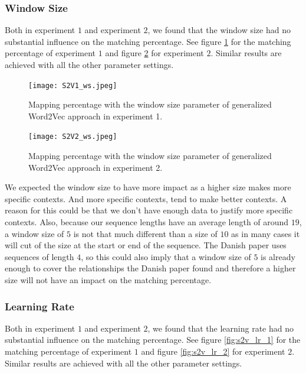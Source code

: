 \subsubsection{Window Size}

Both in experiment $1$ and experiment $2$, we found that the window size had no substantial influence on the matching percentage. See figure \ref{fig:s2v_ws_1} for the matching percentage of experiment $1$ and figure \ref{fig:s2v_ws_2} for experiment $2$. Similar results are achieved with all the other parameter settings. \\

\begin{figure}[!htb]
	\centering
	\texttt{[image: S2V1\_ws.jpeg]}
	\caption{Mapping percentage with the window size parameter of generalized Word2Vec approach in experiment 1.}
	\label{fig:s2v_ws_1}
\end{figure}

\begin{figure}[!htb]
	\centering
	\texttt{[image: S2V2\_ws.jpeg]}
	\caption{Mapping percentage with the window size parameter of generalized Word2Vec approach in experiment 2.}
	\label{fig:s2v_ws_2}
\end{figure}

We expected the window size to have more impact as a higher size makes more specific contexts. And more specific contexts, tend to make better contexts. A reason for this could be that we don't have enough data to justify more specific contexts. Also, because our sequence lengths have an average length of around $19$, a window size of $5$ is not that much different than a size of $10$ as in many cases it will cut of the size at the start or end of the sequence. The Danish paper uses sequences of length $4$, so this could also imply that a window size of $5$ is already enough to cover the relationships the Danish paper found and therefore a higher size will not have an impact on the matching percentage. 

\subsubsection{Learning Rate}

Both in experiment $1$ and experiment $2$, we found that the learning rate had no substantial influence on the matching percentage. See figure \ref{fig:s2v_lr_1} for the matching percentage of experiment $1$ and figure \ref{fig:s2v_lr_2} for experiment $2$. Similar results are achieved with all the other parameter settings. \\

